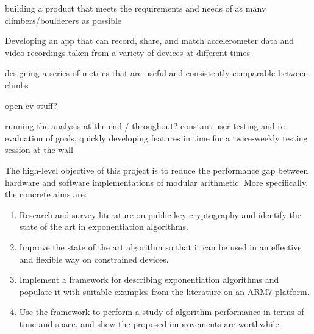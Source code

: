 
building a product that meets the requirements and needs of as many climbers/boulderers as possible

Developing an app that can record, share, and match accelerometer data and video recordings taken from a variety of devices at different times

designing a series of metrics that are useful and consistently comparable between climbs

open cv stuff?


running the analysis at the end / throughout?
constant user testing and re-evaluation of goals, quickly developing features in time for a twice-weekly testing session at the wall











\noindent
The high-level objective of this project is to reduce the performance
gap between hardware and software implementations of modular arithmetic.
More specifically, the concrete aims are:

\begin{enumerate}
\item Research and survey literature on public-key cryptography and
      identify the state of the art in exponentiation algorithms.
\item Improve the state of the art algorithm so that it can be used
      in an effective and flexible way on constrained devices.
\item Implement a framework for describing exponentiation algorithms
      and populate it with suitable examples from the literature on
      an ARM7 platform.
\item Use the framework to perform a study of algorithm performance
      in terms of time and space, and show the proposed improvements
      are worthwhile.
\end{enumerate}
